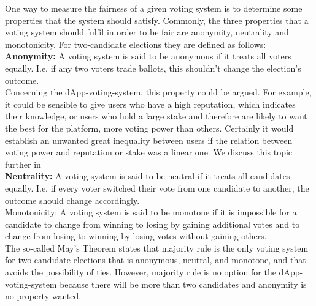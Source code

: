 One way to measure the fairness of a given voting system is to determine some properties that the system should satisfy. 
Commonly, the three properties that a voting system should fulfil in order to be fair are anonymity, neutrality and monotonicity. For two-candidate elections they are defined as follows: \\
{\bf{Anonymity:}} A voting system is said to be anonymous if it treats all voters equally. I.e. if any two voters trade ballots, this shouldn't change the election's outcome. \\
Concerning the dApp-voting-system, this property could be argued. For example, it could be sensible to give users who have a high reputation, which indicates their knowledge, or users who hold a large stake and therefore are likely to want the best for the platform, more voting power than others. Certainly it would establish an unwanted great inequality between users if the relation between voting power and reputation or stake was a linear one. We discuss this topic further in \\%
{\bf{Neutrality:}} A voting system is said to be neutral if it treats all candidates equally. I.e. if every voter switched their vote from one candidate to another, the outcome should change accordingly. \\
Monotonicity: A voting system is said to be monotone if it is impossible for a candidate to change from winning to losing by gaining additional votes and to change from losing to winning by losing votes without gaining others. \\
The so-called May's Theorem states that majority rule %
is the only voting system for two-candidate-elections that is anonymous, neutral, and monotone, and that avoids the possibility of ties. However, majority rule is no option for the dApp-voting-system because there will be more than two candidates and anonymity is no property wanted. \\


